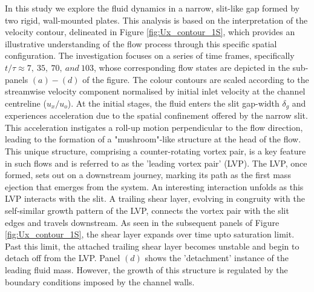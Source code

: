 \documentclass[final,3p,times,authoryear]{elsarticle}
\begin{document}
In this study we explore the fluid dynamics in a narrow, slit-like gap formed by two rigid, wall-mounted plates. This analysis is based on the interpretation of the velocity contour, delineated in Figure \ref{fig:Ux_contour_1S}, which provides an illustrative understanding of the flow process through this specific spatial configuration. The investigation focuses on a series of time frames, specifically $t/\tau \approx 7,\ 35,\ 70,\ and \ 103$, whose corresponding flow states are depicted in the sub-panels $(a)-(d)$ of the figure. The colour contours are scaled according to the streamwise velocity component normalised by initial inlet velocity at the channel centreline ($u_x/u_o$). At the initial stages, the fluid enters the slit gap-width $\delta_g$ and experiences acceleration due to the spatial confinement offered by the narrow slit. This acceleration instigates a roll-up motion perpendicular to the flow direction, leading to the formation of a "mushroom"-like structure at the head of the flow. This unique structure, comprising a counter-rotating vortex pair, is a key feature in such flows and is referred to as the 'leading vortex pair' (LVP). The LVP, once formed, sets out on a downstream journey, marking its path as the first mass ejection that emerges from the system. An interesting interaction unfolds as this LVP interacts with the slit. A trailing shear layer, evolving in congruity with the self-similar growth pattern of the LVP, connects the vortex pair with the slit edges and travels downstream. As seen in the subsequent panels of Figure \ref{fig:Ux_contour_1S}, the shear layer expands over time upto saturation limit. Past this limit, the attached trailing shear layer becomes unstable and begin to detach off from the LVP. Panel $(d)$ shows the 'detachment' instance of the leading fluid mass. However, the growth of this structure is regulated by the boundary conditions imposed by the channel walls.
\end{document}
